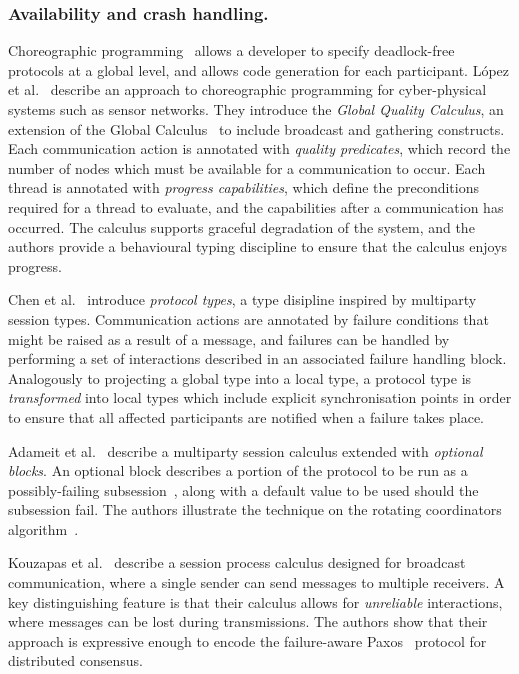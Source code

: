 \documentclass[
graybox,
envcountchap
]{svmult}
\begin{document}
\begin{bibunit}
  \subsubsection{Availability and crash handling.}

  Choreographic programming~\cite{CarboneM13:df-design} allows a developer to
  specify deadlock-free protocols at a global level, and allows code generation
  for each participant. L\'opez et al.~\cite{LopezNN16:availability} describe an
  approach to choreographic programming for cyber-physical systems such as
  sensor networks. They introduce the \emph{Global Quality Calculus}, an
  extension of the Global Calculus~\cite{CarboneM13:df-design} to include
  broadcast and gathering constructs. Each communication action is annotated
  with \emph{quality predicates}, which record the number of nodes which must be
  available for a communication to occur. Each thread is annotated with
  \emph{progress capabilities}, which define the preconditions required for a
  thread to evaluate, and the capabilities after a communication has occurred.
  The calculus supports graceful degradation of the system, and the authors
  provide a behavioural typing discipline to ensure that the calculus enjoys
  progress.

  Chen et al.~\cite{ChenVBZE16:failure-handling} introduce \emph{protocol
  types}, a type disipline inspired by multiparty session types. Communication
  actions are annotated by failure conditions that might be raised as a result
  of a message, and failures can be handled by performing a set of interactions
  described in an associated failure handling block. Analogously to projecting a
  global type into a local type, a protocol type is \emph{transformed} into
  local types which include explicit synchronisation points in order to ensure
  that all affected participants are notified when a failure takes place.

  Adameit et al.~\cite{AdameitPN17:link-failures} describe a multiparty session
  calculus extended with \emph{optional blocks}. An optional block describes a
  portion of the protocol to be run as a possibly-failing
  subsession~\cite{DemangeonH12:subsessions}, along with a default value to be
  used should the subsession fail. The authors illustrate the technique on the
  rotating coordinators algorithm~\cite{Tel00:dist-algorithms}.


  Kouzapas et al.~\cite{KouzapasGVG19:async-broadcast} describe a session
  process calculus designed for broadcast communication, where a single sender
  can send messages to multiple
  receivers. A key distinguishing feature is that their calculus allows for
  \emph{unreliable} interactions, where messages can be lost during
  transmissions. The authors show that their approach is expressive enough to
  encode the failure-aware Paxos~\cite{Lamport98:paxos} protocol for distributed
  consensus.


\end{bibunit}
\end{document}
